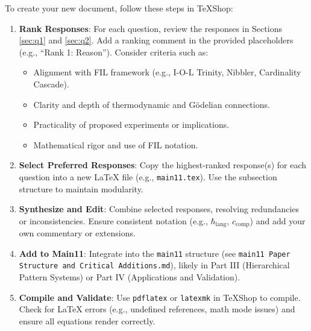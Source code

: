 \documentclass[11pt,letterpaper]{article}
\begin{document}
\begin{itemize}
To create your new document, follow these steps in TeXShop:
\begin{enumerate}
    \item \textbf{Rank Responses}: For each question, review the responses in Sections \ref{sec:q1} and \ref{sec:q2}. Add a ranking comment in the provided placeholders (e.g., “Rank 1: Reason”). Consider criteria such as:
    \begin{itemize}
        \item Alignment with FIL framework (e.g., I-O-L Trinity, Nibbler, Cardinality Cascade).
        \item Clarity and depth of thermodynamic and Gödelian connections.
        \item Practicality of proposed experiments or implications.
        \item Mathematical rigor and use of FIL notation.
    \end{itemize}
    \item \textbf{Select Preferred Responses}: Copy the highest-ranked response(s) for each question into a new LaTeX file (e.g., \texttt{main11.tex}). Use the subsection structure to maintain modularity.
    \item \textbf{Synthesize and Edit}: Combine selected responses, resolving redundancies or inconsistencies. Ensure consistent notation (e.g., $\hbar_{\text{lang}}$, $c_{\text{comp}}$) and add your own commentary or extensions.
    \item \textbf{Add to Main11}: Integrate into the \texttt{main11} structure (see \texttt{main11 Paper Structure and Critical Additions.md}), likely in Part III (Hierarchical Pattern Systems) or Part IV (Applications and Validation).
    \item \textbf{Compile and Validate}: Use \texttt{pdflatex} or \texttt{latexmk} in TeXShop to compile. Check for LaTeX errors (e.g., undefined references, math mode issues) and ensure all equations render correctly.
\end{enumerate}



\end{itemize}
\end{document}
